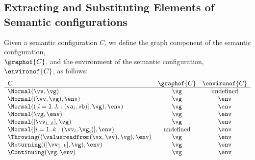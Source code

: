 \subsection{Extracting and Substituting Elements of Semantic configurations}

\hypertarget{def-graphof}{}
\hypertarget{def-environof}{}
Given a semantic configuration $C$, we define the graph component of the semantic configuration, \\
$\graphof{C}$, and the environment of the semantic configuration, $\environof{C}$, as follows:
\[
\begin{array}{lcc}
  C & \graphof{C} & \environof{C}\\
  \hline
  \Normal(\vv,\vg) & \vg & \text{undefined}\\
  \Normal((\vv,\vg), \env) & \vg & \env\\
  \Normal(([i=1..k: (\texttt{va}_i,\texttt{vb})],\vg), \env) & \vg & \env\\
  \Normal(\vg, \env) & \vg & \env\\
  \Normal([\vv_{1..k}], \vg) & \vg & \env\\
  \Normal([i=1..k: (\vv_i,\vg_i)], \env) & \text{undefined} & \env\\
  \Throwing((\valuereadfrom(\vx,\vv),\vg), \env) & \vg & \env\\
  \Returning(([\vv_{1..k}],\vg), \env) & \vg & \env\\
  \Continuing(\vg, \env) & \vg & \env\\
\end{array}
\]

